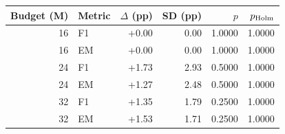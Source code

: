 \begin{tabular}{rlrrrr}
\toprule
Budget (M) & Metric & $\Delta$ (pp) & SD (pp) & $p$ & $p_{\rm Holm}$ \\
\midrule
16 & F1 & +0.00 & 0.00 & 1.0000 & 1.0000 \\
16 & EM & +0.00 & 0.00 & 1.0000 & 1.0000 \\
24 & F1 & +1.73 & 2.93 & 0.5000 & 1.0000 \\
24 & EM & +1.27 & 2.48 & 0.5000 & 1.0000 \\
32 & F1 & +1.35 & 1.79 & 0.2500 & 1.0000 \\
32 & EM & +1.53 & 1.71 & 0.2500 & 1.0000 \\
\bottomrule
\end{tabular}
